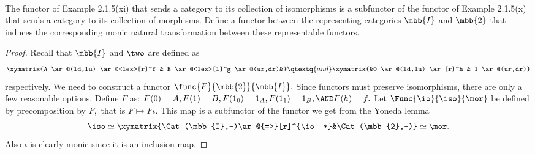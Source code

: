 \documentclass[main.tex]{subfiles}
\begin{document}
\paragraph{}
\begin{exercise}
	The functor of Example 2.1.5(xi) that sends a category to its collection of
	isomorphisms is a subfunctor of the functor of Example 2.1.5(x) that sends
	a category to its collection of morphisms. Define a functor between the
	representing categories $ \mbb{I} $ and $ \mbb{2} $ that induces the
	corresponding monic natural transformation between these representable
	functors.
\end{exercise}

\begin{proof}
	Recall that $\mbb{I}$ and $\two$ are defined as
	\[\xymatrix{A \ar@(ld,lu) \ar@<1ex>[r]^f & B \ar@<1ex>[l]^g \ar@(ur,dr)&}
	\qtextq{and} \xymatrix{&0 \ar@(ld,lu) \ar[r]^h & 1 \ar@(ur,dr)}\]
	respectively.
	We need to construct a functor $ \func{F}{\mbb{2}}{\mbb{I}}.$
	Since functors must preserve isomorphisms, there are only a few reasonable
	options. Define $ F $ as: $ F(0)=A,F(1)=B, F(1_0)=1_A,F(1_1)=1_B,\AND F(h)=
	f.$ Let $\Func{\io}{\iso}{\mor}$ be defined by precomposition by $F,$ that is $
	F\mapsto F\iota. $ This map is a subfunctor of the functor we
	get from the Yoneda lemma
	$$
	\iso \simeq \xymatrix{\Cat(\mbb{I},-)\ar@{=>}[r]^{\io_*}&\Cat(\mbb{2},-)} \simeq \mor.
	$$
	Also $ \iota $ is clearly monic since it is an inclusion map.
\end{proof}
\end{document}
